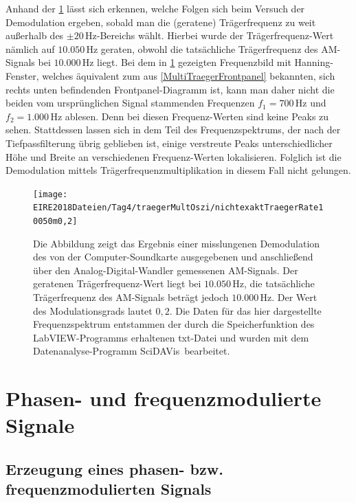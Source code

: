 \documentclass[
a4paper,
12pt,
pagesize,
ngerman
]{scrartcl}
\begin{document}
	Anhand der \cref{AMDemodfailm02} lässt sich erkennen, welche Folgen sich beim Versuch der Demodulation ergeben, sobald man die (geratene) Trägerfrequenz zu weit außerhalb des $\pm 20\,$Hz-Bereichs wählt.
	Hierbei wurde der Trägerfrequenz-Wert nämlich auf $10.050\,$Hz geraten, obwohl die tatsächliche Trägerfrequenz des AM-Signals bei $10.000\,$Hz liegt.
	Bei dem in \cref{AMDemodfailm02} gezeigten Frequenzbild mit Hanning-Fenster, welches äquivalent zum aus \cref{MultiTraegerFrontpanel} bekannten, sich rechts unten befindenden Frontpanel-Diagramm ist, kann man daher nicht die beiden vom ursprünglichen Signal stammenden Frequenzen $f_1 = 700\,$Hz und $f_2 = 1.000\,$Hz ablesen.
	Denn bei diesen Frequenz-Werten sind keine Peaks zu sehen.
	Stattdessen lassen sich in dem Teil des Frequenzspektrums, der nach der Tiefpassfilterung übrig geblieben ist, einige verstreute Peaks unterschiedlicher Höhe und Breite an verschiedenen Frequenz-Werten lokalisieren.
	Folglich ist die Demodulation mittels Trägerfrequenzmultiplikation in diesem Fall nicht gelungen.
	
	\begin{figure}[H]
		\centering
		\texttt{[image: EIRE2018Dateien/Tag4/traegerMultOszi/nichtexaktTraegerRate10050m0,2]}
		\caption{Die Abbildung zeigt das Ergebnis einer misslungenen Demodulation des von der Computer-Soundkarte ausgegebenen und anschließend über den Analog-Digital-Wandler gemessenen AM-Signals. Der geratenen Trägerfrequenz-Wert liegt bei $10.050\,$Hz, die tatsächliche Trägerfrequenz des AM-Signals beträgt jedoch $10.000\,$Hz. Der Wert des Modulationsgrads lautet $0,2$. Die Daten für das hier dargestellte Frequenzspektrum entstammen der durch die Speicherfunktion des LabVIEW-Programms erhaltenen txt-Datei und wurden mit dem Datenanalyse-Programm \glqq SciDAVis\grqq\ bearbeitet.}
		\label{AMDemodfailm02}
	\end{figure}
	
	\newpage
	
	
	\section{Phasen- und frequenzmodulierte Signale}

	\subsection{Erzeugung eines phasen- bzw. frequenzmodulierten Signals} \label{FMPMErzeugung} %
	
\end{document}
